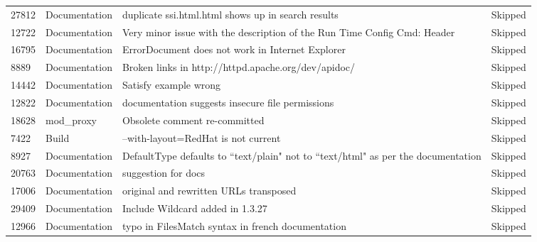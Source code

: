 \begin{longtable}[c]{p{1cm}p{3cm}p{6cm}p{4cm}}
27812  & Documentation      & duplicate ssi.html.html shows up in search results                                                             & Skipped           \\
12722  & Documentation      & Very minor issue with the description of the Run Time Config Cmd: Header                                       & Skipped           \\
16795  & Documentation      & ErrorDocument does not work in Internet Explorer                                                               & Skipped           \\
8889   & Documentation      & Broken links in http://httpd.apache.org/dev/apidoc/                                                            & Skipped           \\
14442  & Documentation      & Satisfy example wrong                                                                                          & Skipped           \\
12822  & Documentation      & documentation suggests insecure file permissions                                                               & Skipped           \\
18628  & mod\_proxy         & Obsolete comment re-committed                                                                                  & Skipped           \\
7422   & Build              & --with-layout=RedHat is not current                                                                            & Skipped           \\
8927   & Documentation      & DefaultType defaults to ``text/plain" not to ``text/html" as per the documentation                               & Skipped           \\
20763  & Documentation      & suggestion for docs                                                                                            & Skipped           \\
17006  & Documentation      & original and rewritten URLs transposed                                                                         & Skipped           \\
29409  & Documentation      & Include Wildcard added in 1.3.27                                                                               & Skipped           \\
12966  & Documentation      & typo in FilesMatch syntax in french documentation                                                              & Skipped           \\

\end{longtable}
